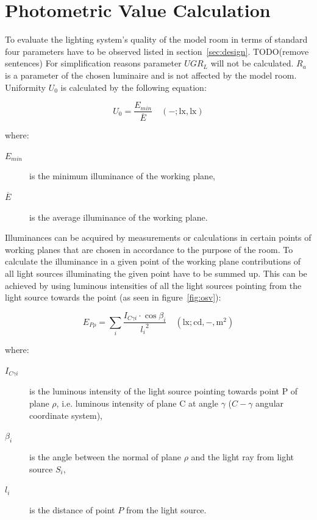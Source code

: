 \section{Photometric Value Calculation}
To evaluate the lighting system's quality of the model room in terms of standard \cite{12464} four parameters have to be observed listed in section~\ref{sec:design}. TODO(remove sentences) For simplification reasons parameter $UGR_{L}$ will not be calculated. $R_{a}$ is a parameter of the chosen luminaire and is not affected by the model room. Uniformity $U_{0}$ is calculated by the following equation:

\begin{equation}
U_{0}=\frac{E_{min}}{\overline{E}} \quad \mathrm{(-;lx,lx)}
\end{equation}

where:
\begin{description}
	\item[$E_{min}$] is the minimum illuminance of the working plane,
	\item[$\overline{E}$] is the average illuminance of the working plane.
\end{description}

Illuminances can be acquired by measurements or calculations in certain points of working planes that are chosen in accordance to the purpose of the room. To calculate the illuminance in a given point of the working plane contributions of all light sources illuminating the given point have to be summed up. This can be achieved by using luminous intensities of all the light sources pointing from the light source towards the point (as seen in figure~\ref{fig:osv}):

\begin{equation}
E_{P\rho}=\sum_{i} \frac{I_{C \gamma i} \cdot \cos{\beta_{i}}}{{l_{i}}^{2}} \quad \mathrm{(lx;cd,-,m^{2})}
\label{eq:illSum}
\end{equation}

where:
\begin{description}
	\item[$I_{C \gamma i}$] is the luminous intensity of the light source pointing towards point P of plane $\rho$, i.e. luminous intensity of plane C at angle $\gamma$ ($C-\gamma$ angular coordinate system),
	\item[$\beta_{i}$] is the angle between the normal of plane $\rho$ and the light ray from light source $S_{i}$,
	\item[$l_{i}$] is the distance of point $P$ from the light source.
\end{description}

